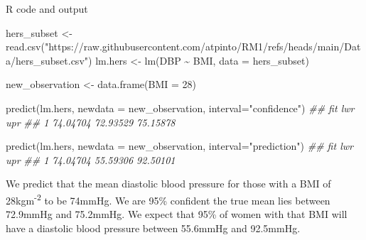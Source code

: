\documentclass[
  letterpaper,
  DIV=11,
  numbers=noendperiod]{scrreprt}
\newenvironment{Shaded}{\begin{snugshade}}{\end{snugshade}}
\newcommand{\AttributeTok}[1]{\textcolor[rgb]{0.40,0.45,0.13}{#1}}
\newcommand{\DecValTok}[1]{\textcolor[rgb]{0.68,0.00,0.00}{#1}}
\newcommand{\DocumentationTok}[1]{\textcolor[rgb]{0.37,0.37,0.37}{\textit{#1}}}
\newcommand{\FunctionTok}[1]{\textcolor[rgb]{0.28,0.35,0.67}{#1}}
\newcommand{\NormalTok}[1]{\textcolor[rgb]{0.00,0.23,0.31}{#1}}
\newcommand{\OtherTok}[1]{\textcolor[rgb]{0.00,0.23,0.31}{#1}}
\newcommand{\SpecialCharTok}[1]{\textcolor[rgb]{0.37,0.37,0.37}{#1}}
\newcommand{\StringTok}[1]{\textcolor[rgb]{0.13,0.47,0.30}{#1}}
\begin{document}
R code and output

\begin{Shaded}
\begin{Highlighting}[]
\NormalTok{hers\_subset }\OtherTok{\textless{}{-}} \FunctionTok{read.csv}\NormalTok{(}\StringTok{"https://raw.githubusercontent.com/atpinto/RM1/refs/heads/main/Data/hers\_subset.csv"}\NormalTok{)}
\NormalTok{lm.hers }\OtherTok{\textless{}{-}} \FunctionTok{lm}\NormalTok{(DBP }\SpecialCharTok{\textasciitilde{}}\NormalTok{ BMI, }\AttributeTok{data =}\NormalTok{ hers\_subset)}

\NormalTok{new\_observation }\OtherTok{\textless{}{-}} \FunctionTok{data.frame}\NormalTok{(}\AttributeTok{BMI =} \DecValTok{28}\NormalTok{)}

\FunctionTok{predict}\NormalTok{(lm.hers, }
        \AttributeTok{newdata =}\NormalTok{ new\_observation, }
        \AttributeTok{interval=}\StringTok{"confidence"}\NormalTok{)}
\DocumentationTok{\#\#        fit      lwr      upr}
\DocumentationTok{\#\# 1 74.04704 72.93529 75.15878}

\FunctionTok{predict}\NormalTok{(lm.hers, }
        \AttributeTok{newdata =}\NormalTok{ new\_observation, }
        \AttributeTok{interval=}\StringTok{"prediction"}\NormalTok{)}
\DocumentationTok{\#\#        fit      lwr      upr}
\DocumentationTok{\#\# 1 74.04704 55.59306 92.50101}
\end{Highlighting}
\end{Shaded}

We predict that the mean diastolic blood pressure for those with a BMI
of 28kgm\textsuperscript{-2} to be 74mmHg. We are 95\% confident the
true mean lies between 72.9mmHg and 75.2mmHg. We expect that 95\% of
women with that BMI will have a diastolic blood pressure between
55.6mmHg and 92.5mmHg.
\end{document}
